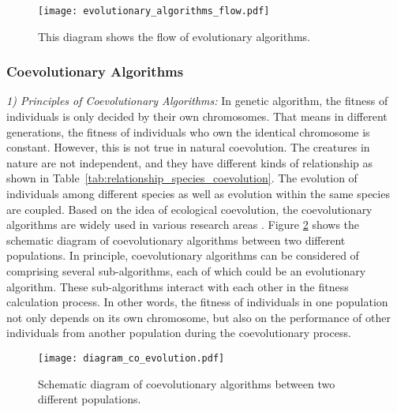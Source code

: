 \begin{figure}[htbp]
  \centering
  \texttt{[image: evolutionary\_algorithms\_flow.pdf]}
  \caption{This diagram shows the flow of evolutionary algorithms.}
  \label{fig:evolutionary_algorithms_flow}
\end{figure}

\subsubsection{Coevolutionary Algorithms}

\textit{1) Principles of Coevolutionary Algorithms:} In genetic algorithm, the fitness of individuals is only decided by their own chromosomes. That means in different generations, the fitness of individuals who own the identical chromosome is constant. However, this is not true in natural coevolution. The creatures in nature are not independent, and they have different kinds of relationship as shown in Table~\ref{tab:relationship_species_coevolution}. The evolution of individuals among different species as well as evolution within the same species are coupled. Based on the idea of ecological coevolution, the coevolutionary algorithms are widely used in various research areas \cite{Rosin_1997}. Figure \ref{Fig: diagram_coevolution} shows the schematic diagram of coevolutionary algorithms between two different populations. In principle, coevolutionary algorithms can be considered of comprising several sub-algorithms, each of which could be an evolutionary algorithm. These sub-algorithms interact with each other in the fitness calculation process. In other words, the fitness of individuals in one population not only depends on its own chromosome, but also on the performance of other individuals from another population during the coevolutionary process. 

\begin{figure}[htbp]
  \centering
  \texttt{[image: diagram\_co\_evolution.pdf]}
  \caption{Schematic diagram of coevolutionary algorithms between two different populations.}
  \label{Fig: diagram_coevolution}
\end{figure}

